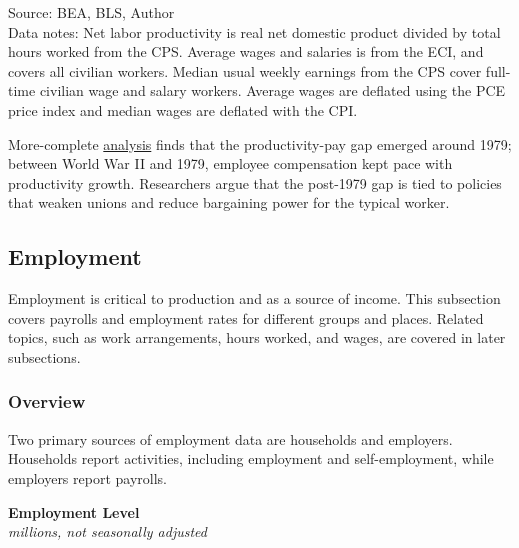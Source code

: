 \documentclass{report}
\newcommand{\tbllink}[1]{\href{https://raw.githubusercontent.com/bdecon/US-chartbook/master/chartbook/data/#1}{\faTable}}
\begin{document}
{\begin{minipage}{1.0\textwidth}
\footnotesize{Source: BEA, BLS, Author} \hfill \tbllink{payprod.csv}\\
\footnotesize{Data notes: Net labor productivity is real net domestic product divided by total hours worked from the CPS. Average wages and salaries is from the ECI, and covers all civilian workers. Median usual weekly earnings from the CPS cover full-time civilian wage and salary workers. Average wages are deflated using the PCE price index and median wages are deflated with the CPI.}
\vspace{1mm}

\small More-complete \href{https://www.epi.org/productivity-pay-gap/}{analysis} finds that the productivity-pay gap emerged around 1979; between World War II and 1979, employee compensation kept pace with productivity growth. Researchers argue that the post-1979 gap is tied to policies that weaken unions and reduce bargaining power for the typical worker. 
\end{minipage}
\newpage
\begin{minipage}{1.0\textwidth} 
\hypertarget{labe}{\label{labe}}
\subsection*{Employment}
\small Employment is critical to production and as a source of income. This subsection covers payrolls and employment rates for different groups and places. Related topics, such as work arrangements, hours worked, and wages, are covered in later subsections. 

\subsubsection*{Overview}
\vspace*{-0.5mm}

\small Two primary sources of employment data are households and employers. Households report activities, including employment and self-employment, while employers report payrolls.


\end{minipage}

\begin{minipage}{0.42\textwidth}
\normalsize \textbf{Employment Level}\\
\footnotesize{\textit{millions, not seasonally adjusted}}
\vspace{4.25cm}


\end{minipage}}
\end{document}
